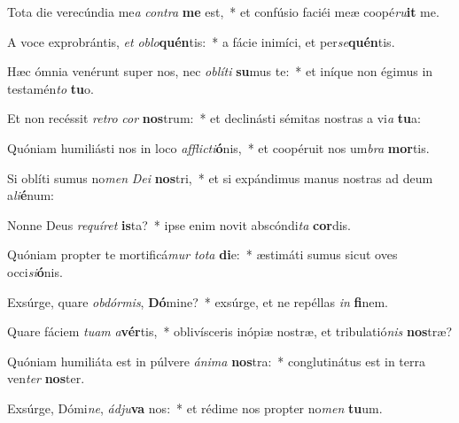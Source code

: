 \item Tota die verecúndia me\textit{a} \textit{con}\textit{tra} \textbf{me} est,~* et confúsio faciéi meæ coopé\textit{ru}\textbf{it} me.
\item A voce exprobrántis, \textit{et} \textit{ob}\textit{lo}\textbf{quén}tis:~* a fácie inimíci, et per\textit{se}\textbf{quén}tis.
\item Hæc ómnia venérunt super nos, nec \textit{ob}\textit{lí}\textit{ti} \textbf{su}mus te:~* et iníque non égimus in testamén\textit{to} \textbf{tu}o.
\item Et non recéssit \textit{re}\textit{tro} \textit{cor} \textbf{nos}trum:~* et declinásti sémitas nostras a vi\textit{a} \textbf{tu}a:
\item Quóniam humiliásti nos in loco \textit{af}\textit{flic}\textit{ti}\textbf{ó}nis,~* et coopéruit nos um\textit{bra} \textbf{mor}tis.
\item Si oblíti sumus no\textit{men} \textit{De}\textit{i} \textbf{nos}tri,~* et si expándimus manus nostras ad deum a\textit{li}\textbf{é}num:
\item Nonne Deus \textit{re}\textit{quí}\textit{ret} \textbf{is}ta?~* ipse enim novit abscóndi\textit{ta} \textbf{cor}dis.
\item Quóniam propter te mortificá\textit{mur} \textit{to}\textit{ta} \textbf{di}e:~* æstimáti sumus sicut oves occi\textit{si}\textbf{ó}nis.
\item Exsúrge, quare \textit{ob}\textit{dór}\textit{mis}, \textbf{Dó}mine?~* exsúrge, et ne repéllas \textit{in} \textbf{fi}nem.
\item Quare fáciem \textit{tu}\textit{am} \textit{a}\textbf{vér}tis,~* oblivísceris inópiæ nostræ, et tribulatió\textit{nis} \textbf{nos}træ?
\item Quóniam humiliáta est in púlvere \textit{á}\textit{ni}\textit{ma} \textbf{nos}tra:~* conglutinátus est in terra ven\textit{ter} \textbf{nos}ter.
\item Exsúrge, Dómi\textit{ne}, \textit{ád}\textit{ju}\textbf{va} nos:~* et rédime nos propter no\textit{men} \textbf{tu}um.
